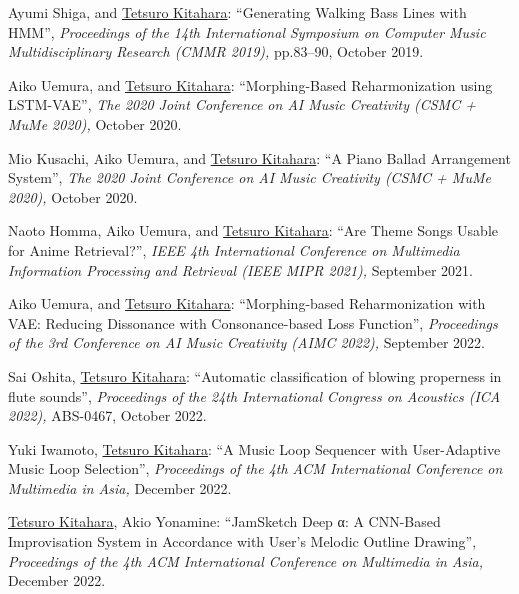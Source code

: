 \begin{Enumerate}
\item 
Ayumi Shiga, 
and 
\underline{Tetsuro Kitahara}: 
    ``Generating Walking Bass Lines with HMM'', 
    {\it Proceedings of the 14th International Symposium on Computer Music Multidisciplinary Research (CMMR 2019),
    } pp.83--90, October 2019. 

\item 
Aiko Uemura, 
and 
\underline{Tetsuro Kitahara}: 
    ``Morphing-Based Reharmonization using LSTM-VAE'', 
    {\it The 2020 Joint Conference on AI Music Creativity (CSMC + MuMe 2020),
    } October 2020. 

\item 
Mio Kusachi, 
Aiko Uemura, 
and 
\underline{Tetsuro Kitahara}: 
    ``A Piano Ballad Arrangement System'', 
    {\it The 2020 Joint Conference on AI Music Creativity (CSMC + MuMe 2020),
    } October 2020. 

\item 
Naoto Homma, 
Aiko Uemura, 
and 
\underline{Tetsuro Kitahara}: 
    ``Are Theme Songs Usable for Anime Retrieval?'', 
    {\it IEEE 4th International Conference on Multimedia Information Processing and Retrieval (IEEE MIPR 2021),
    } September 2021. 

\item 
Aiko Uemura, 
and 
\underline{Tetsuro Kitahara}: 
    ``Morphing-based Reharmonization with VAE: Reducing Dissonance with Consonance-based Loss Function'', 
    {\it Proceedings of the 3rd Conference on AI Music Creativity (AIMC 2022),
    } September 2022. 

\item 
Sai Oshita, 
\underline{Tetsuro Kitahara}: 
    ``Automatic classification of blowing properness in flute sounds'', 
    {\it Proceedings of the 24th International Congress on Acoustics (ICA 2022),
    } ABS-0467, October 2022. 

\item 
Yuki Iwamoto, 
\underline{Tetsuro Kitahara}: 
    ``A Music Loop Sequencer with User-Adaptive Music Loop Selection'', 
    {\it Proceedings of the 4th ACM International Conference on Multimedia in Asia,
    } December 2022. 

\item 
\underline{Tetsuro Kitahara}, 
Akio Yonamine: 
    ``JamSketch Deep α: A CNN-Based Improvisation System in Accordance with User's Melodic Outline Drawing'', 
    {\it Proceedings of the 4th ACM International Conference on Multimedia in Asia,
    } December 2022. 

\end{Enumerate}

